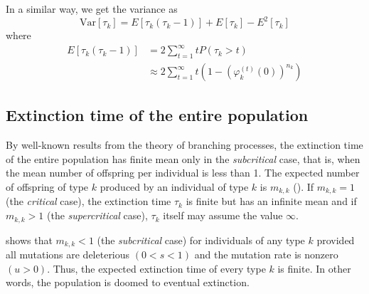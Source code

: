\documentclass[9pt,lineno]{elife}
\begin{document}
In a similar way, we get the variance as
%
\begin{equation}
\mathrm{Var}[\tau_{k}]=E[\tau_{k}(\tau_{k}-1)]+E[\tau_{k}]-E^{2}[\tau_{k}]
\label{eq:vartauk}
\end{equation}
%
where
%
\begin{align*}
%
E[\tau_{k}(\tau_{k}-1)] & =  2\sum_{t=1}^{\infty}tP(\tau_{k}>t)\\[5pt]
& \approx  2\sum_{t=1}^{\infty}t\left(1-\left(\varphi_{k}^{(t)}(0)\right)^{n_k}\right)
%
\end{align*}


\subsection{Extinction time of the entire population}


By well-known results from the theory of branching processes, the extinction time of the entire population has finite mean only in the {\em subcritical} case, that is, when the mean number of offspring per individual is less than 1. 
The expected number of offspring of type $k$ produced by an individual of type $k$ is $m_{k,k}$ ().  
If $m_{k,k}=1$ (the \emph{critical} case), the extinction time $\tau_k$ is finite but has an infinite mean and if $m_{k,k} > 1$ (the {\em supercritical} case), $\tau_k$ itself may assume the value $\infty$.  

 shows that $m_{k,k} < 1$ (the {\em subcritical} case) for individuals of any type $k$ provided all mutations are deleterious $(0<s<1)$ and the mutation rate is nonzero $(u>0)$.  Thus, the expected extinction time of every type $k$ is finite.  
In other words, the population is doomed to eventual extinction.
\end{document}
